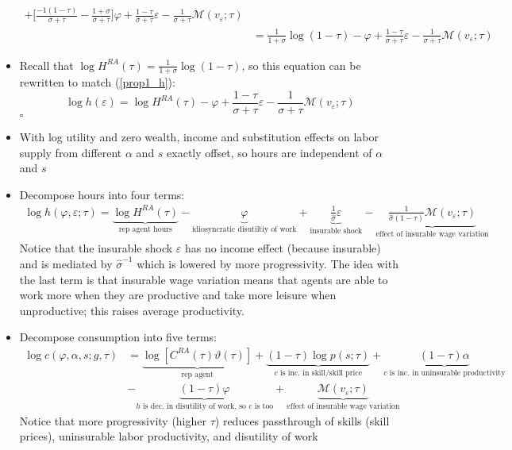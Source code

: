 \documentclass{article}
\newcommand{\M}{\mathcal{M}}
\begin{document}
\begin{itemize}
\begin{align*}
+ \Bigg[\frac{-1(1-\tau)}{\sigma+\tau} -\frac{1+\sigma}{\sigma+\tau} \Bigg] \varphi
+ \frac{1-\tau}{\sigma+\tau} \varepsilon
- \frac{1}{\sigma+\tau} \M ( v_\varepsilon; \tau)\\
&=  \frac{1}{1+\sigma} \log (1-\tau) - \varphi
+ \frac{1-\tau}{\sigma+\tau} \varepsilon
- \frac{1}{\sigma+\tau} \M ( v_\varepsilon; \tau)
\end{align*}
\item Recall that $\log H^{RA}(\tau) = \frac{1}{1 + \sigma} \log ( 1 - \tau)$, so this equation can be rewritten to match (\ref{prop1_h}):
$$
\log h(\varepsilon) 
=  \log H^{RA}(\tau) - \varphi
+ \frac{1-\tau}{\sigma+\tau} \varepsilon
- \frac{1}{\sigma+\tau} \M ( v_\varepsilon; \tau)
$$
$\square$

\item With log utility and zero wealth, income and substitution effects on labor supply from different $\alpha$ and $s$ exactly offset, so hours are independent of $\alpha$ and $s$

\item Decompose hours into four terms:
\begin{align*}
\log h(\varphi, \varepsilon; \tau) 
= 
\underbrace{\log H^{RA}(\tau)}_{\text{rep agent hours}} 
- 
\underbrace{\varphi}_{\text{idiosyncratic disutiltiy of work}}
+
\underbrace{\frac{1}{\hat{\sigma}} \varepsilon }_{\text{insurable shock}}
- 
\underbrace{\frac{1}{\hat \sigma (1- \tau)} \M (v_\varepsilon; \tau)}_{\text{effect of insurable wage variation}}
\end{align*}
Notice that the insurable shock $\varepsilon$ has no income effect (because insurable) and is mediated by $\hat \sigma^{-1}$ which is lowered by more progressivity. The idea with the last term is that insurable wage variation means that agents are able to work more when they are productive and take more leisure when unproductive; this raises average productivity.

\item Decompose consumption into five terms:
\begin{align*}
\log c(\varphi, \alpha, s; g, \tau) 
&= 
\underbrace{\log [C^{RA}(\tau)\vartheta(\tau)]}_{\text{rep agent}} 
+
\underbrace{(1 - \tau) \log p(s; \tau)}_{\text{$c$ is inc. in skill/skill price}} 
+
\underbrace{(1 - \tau) \alpha }_{\text{$c$ is inc. in uninsurable productivity}}\\
&- 
\underbrace{(1 - \tau) \varphi }_{\text{$h$ is dec. in disutility of work, so $c$ is too}}
+ 
\underbrace{\M (v_\varepsilon; \tau)}_{\text{effect of insurable wage variation}}
\end{align*}
Notice that more progressivity (higher $\tau$) reduces passthrough of skills (skill prices), uninsurable labor productivity, and disutility of work

\end{itemize}
\end{document}
